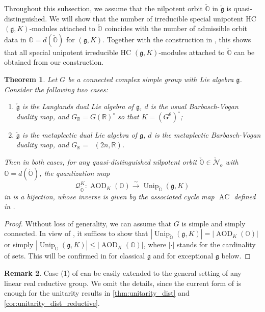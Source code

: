 \documentclass[11pt, a4paper]{amsart}
\newcommand{\g}{\mathfrak{g}}
\newcommand{\orb}{\mathbb{O}}
\newcommand{\fg}{\mathfrak{g}}
\newcommand{\ckfg}{{\check{\fg}}}
\newcommand{\ckorb}{\check{\orb}}
\newcommand{\cN}{\mathcal{N}}
\DeclareMathOperator{\AC}{AC}
\DeclareMathOperator{\AOD}{AOD}
\DeclareMathOperator{\Unip}{Unip}
\DeclareMathOperator{\Mp}{\widetilde{Sp}}
\newcommand{\AODK}{\AOD_K}
\newcommand{\UnipOv}{\Unip_{\ckorb}}
\newcommand{\R}{\mathbb{R}}
\newcommand{\quan}{\mathcal{Q}}
\newcommand{\GR}{G_\R}
\newtheorem{Thm}{Theorem}[subsection]
\theoremstyle{definition}
\newtheorem{Rem}[Thm]{Remark}
\numberwithin{equation}{section}
\begin{document}
Throughout this subsection, we assume that the nilpotent orbit $\ckorb$ in $\ckfg$ is quasi-distinguished. We will show that the number of irreducible special unipotent HC $(\g, K)$-modules attached to $\ckorb$ coincides with the number of admissible orbit data in $\orb = d(\ckorb)$ for $(\g, K)$. Together with the construction in , this shows that all special unipotent irreducible HC $(\g, K)$-modules attached to $\ckorb$ can be obtained from our construction.

\begin{Thm} \label{thm:Unip_AOD_bij}
	Let $G$ be a connected complex simple group with Lie algebra $\g$. Consider the following two cases:
	\begin{enumerate}
		\item $\ckfg$ is the Langlands dual Lie algebra of $\g$, $d$ is the usual Barbasch-Vogan duality map, and $\GR = G(\R)^\circ$ so that $K = (G^\theta)^\circ$;
		\item $\ckfg$ is the metaplectic dual Lie algebra of $\g$, $d$ is the metaplectic Barbasch-Vogan duality map, and $\GR = \Mp(2n,\R)$.
	\end{enumerate}
	Then in both cases, for any quasi-distinguished nilpotent orbit $\ckorb \in \check{\cN}_o$ with $\orb=d(\ckorb)$, the quantization map 
	\[ \quan_{\ckorb}^K: \AODK(\orb) \xrightarrow{\ \scriptstyle\sim \ } \UnipOv(\g, K) \]
	in  is a bijection, whose inverse is given by the associated cycle map $\AC$ defined in .
\end{Thm}

\begin{proof}
	Without loss of generality, we can assume that $G$ is simple and simply connected. 
	In view of , it suffices to show that $|\UnipOv(\g, K)| = |\AODK(\orb)|$ or simply $|\UnipOv(\g, K)| \leqslant |\AODK(\orb)|$, where $|\cdot|$ stands for the cardinality of sets. This will be confirmed in  for classical $\g$ and  for exceptional $\g$ below.
\end{proof}

\begin{Rem}
	Case (1) of  can be easily extended to the general setting of any linear real reductive group. We omit the details, since the current form of  is enough for the unitarity results in \cref{thm:unitarity_dist} and \cref{cor:unitarity_dist_reductive}.
\end{Rem}
\end{document}
